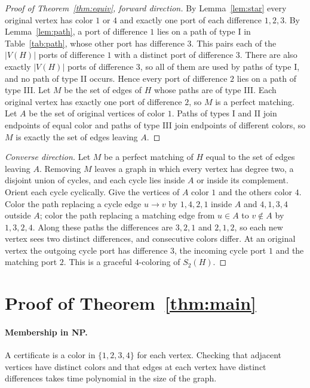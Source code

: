 \documentclass[11pt]{article}
\theoremstyle{remark}
\begin{document}
\begin{proof}[Proof of Theorem~\ref{thm:equiv}, forward direction]
By Lemma~\ref{lem:star} every original vertex has color $1$ or $4$ and exactly
one port of each difference $1,2,3$. By Lemma~\ref{lem:path}, a port of
difference $1$ lies on a path of type I in Table~\ref{tab:path}, whose
other port has difference $3$. This pairs each of the $|V(H)|$ ports of
difference $1$ with a distinct port of difference $3$. There are also exactly
$|V(H)|$ ports of difference $3$, so all of them are used by paths of type I,
and no path of type II occurs. Hence every port of difference $2$ lies on a
path of type III. Let $M$ be the set of edges of $H$ whose paths are of
type III. Each original vertex has exactly one port of
difference $2$, so $M$ is a perfect matching. Let $A$ be the set of original
vertices of color $1$. Paths of types I and II join endpoints of equal color
and paths of type III join endpoints of different colors, so $M$
is exactly the set of edges leaving $A$.
\end{proof}

\begin{proof}[Converse direction]
Let $M$ be a perfect matching of $H$ equal to the set of edges leaving $A$.
Removing $M$ leaves a graph in which every vertex has degree two, a disjoint
union of cycles, and each cycle lies inside $A$ or inside its complement.
Orient each cycle cyclically. Give the vertices of $A$ color $1$ and the others
color $4$. Color the path replacing a cycle edge $u\to v$ by $1,4,2,1$ inside
$A$ and $4,1,3,4$ outside $A$; color the path replacing a matching edge from
$u\in A$ to $v\notin A$ by $1,3,2,4$. Along these paths the differences are
$3,2,1$ and $2,1,2$, so each new vertex sees two distinct differences, and
consecutive colors differ. At an original vertex the outgoing cycle port has
difference $3$, the incoming cycle port $1$ and the matching port $2$. This is
a graceful $4$-coloring of $S_2(H)$.
\end{proof}

\section{Proof of Theorem~\ref{thm:main}}\label{sec:hard}

\paragraph{Membership in NP.} A certificate is a color in $\{1,2,3,4\}$ for
each vertex. Checking that adjacent vertices have distinct colors and that
edges at each vertex have distinct differences takes time polynomial in the
size of the graph.
\end{document}
